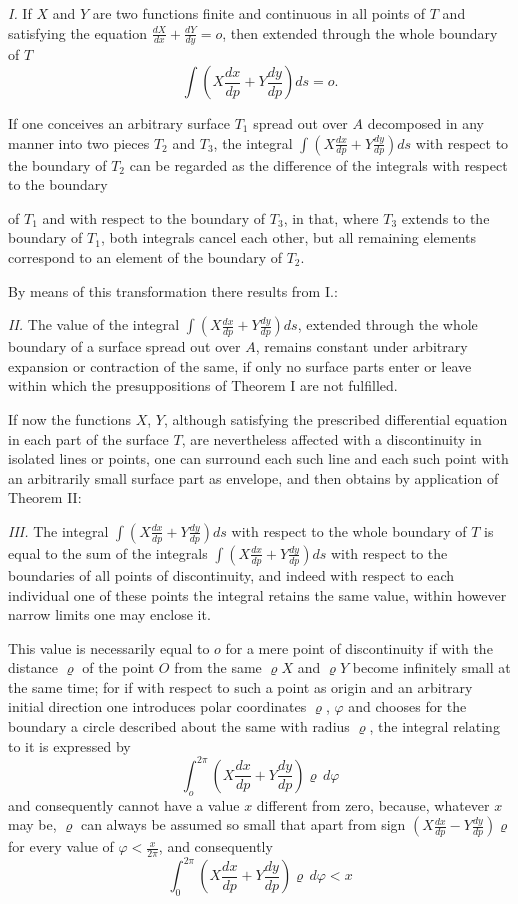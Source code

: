 \documentclass{article}
\begin{document}
\emph{I.} If $X$ and $Y$ are two functions finite and continuous in all points of $T$ and satisfying the equation $\frac{dX}{dx} + \frac{dY}{dy} = o$, then extended through the whole boundary of $T$
\[
\int \left(X\frac{dx}{dp} + Y\frac{dy}{dp}\right) ds = o.
\]

If one conceives an arbitrary surface $T_1$ spread out over $A$ decomposed in any manner into two pieces $T_2$ and $T_3$, the integral $\displaystyle\int \left(X\frac{dx}{dp} + Y\frac{dy}{dp}\right) ds$ with respect to the boundary of $T_2$ can be regarded as the difference of the integrals with respect to the boundary

of $T_1$ and with respect to the boundary of $T_3$, in that, where $T_3$ extends to the boundary of $T_1$, both integrals cancel each other, but all remaining elements correspond to an element of the boundary of $T_2$.

By means of this transformation there results from I.:

\emph{II.} The value of the integral $\displaystyle\int \left(X\frac{dx}{dp} + Y\frac{dy}{dp}\right) ds$, extended through the whole boundary of a surface spread out over $A$, remains constant under arbitrary expansion or contraction of the same, if only no surface parts enter or leave within which the presuppositions of Theorem I are not fulfilled.

If now the functions $X$, $Y$, although satisfying the prescribed differential equation in each part of the surface $T$, are nevertheless affected with a discontinuity in isolated lines or points, one can surround each such line and each such point with an arbitrarily small surface part as envelope, and then obtains by application of Theorem II:

\emph{III.} The integral $\displaystyle\int \left(X\frac{dx}{dp} + Y\frac{dy}{dp}\right) ds$ with respect to the whole boundary of $T$ is equal to the sum of the integrals $\displaystyle\int \left(X\frac{dx}{dp} + Y\frac{dy}{dp}\right) ds$ with respect to the boundaries of all points of discontinuity, and indeed with respect to each individual one of these points the integral retains the same value, within however narrow limits one may enclose it.

This value is necessarily equal to $o$ for a mere point of discontinuity if with the distance $\varrho$ of the point $O$ from the same $\varrho X$ and $\varrho Y$ become infinitely small at the same time; for if with respect to such a point as origin and an arbitrary initial direction one introduces polar coordinates $\varrho$, $\varphi$ and chooses for the boundary a circle described about the same with radius $\varrho$, the integral relating to it is expressed by
\[
\int_o^{2\pi} \left(X\frac{dx}{dp} + Y\frac{dy}{dp}\right) \varrho\,d\varphi
\]
and consequently cannot have a value $x$ different from zero, because, whatever $x$ may be, $\varrho$ can always be assumed so small that apart from sign $\left(X\frac{dx}{dp} - Y\frac{dy}{dp}\right)\varrho$ for every value of $\varphi < \frac{x}{2\pi}$, and consequently
\[
\int_0^{2\pi} \left(X\frac{dx}{dp} + Y\frac{dy}{dp}\right) \varrho\,d\varphi < x
\]
\end{document}
